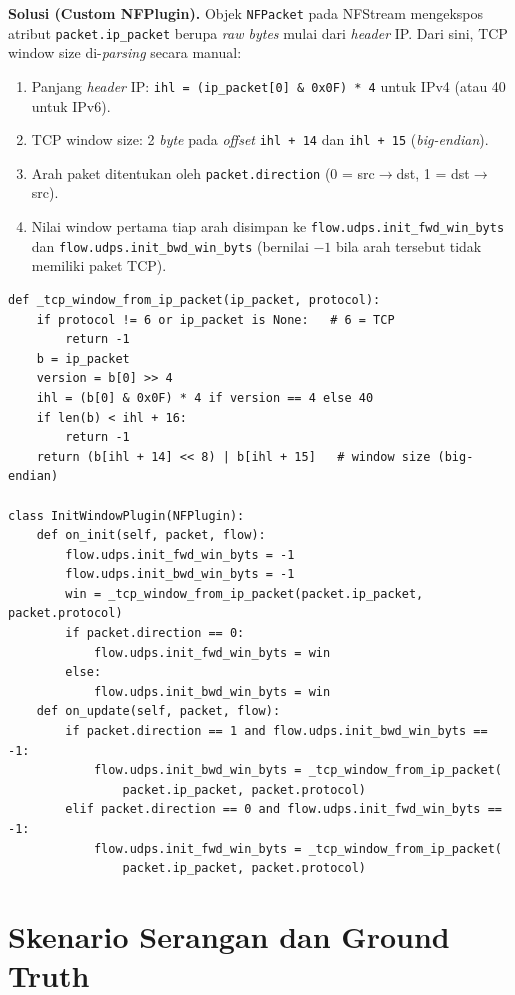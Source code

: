 \documentclass[11pt, a4paper]{article}
\begin{document}
\textbf{Solusi (Custom NFPlugin).} Objek \texttt{NFPacket} pada NFStream mengekspos atribut \texttt{packet.ip\_packet} berupa \textit{raw bytes} mulai dari \textit{header} IP. Dari sini, TCP window size di-\textit{parsing} secara manual:
\begin{enumerate}[leftmargin=1.4cm]
    \item Panjang \textit{header} IP: \texttt{ihl = (ip\_packet[0] \& 0x0F) * 4} untuk IPv4 (atau 40 untuk IPv6).
    \item TCP window size: 2 \textit{byte} pada \textit{offset} \texttt{ihl + 14} dan \texttt{ihl + 15} (\textit{big-endian}).
    \item Arah paket ditentukan oleh \texttt{packet.direction} (0 = src$\to$dst, 1 = dst$\to$src).
    \item Nilai window pertama tiap arah disimpan ke \texttt{flow.udps.init\_fwd\_win\_byts} dan \texttt{flow.udps.init\_bwd\_win\_byts} (bernilai $-1$ bila arah tersebut tidak memiliki paket TCP).
\end{enumerate}

\begin{lstlisting}[style=py, caption={Inti plugin ekstraksi TCP window size (nfstream\_win\_extract.py)}]
def _tcp_window_from_ip_packet(ip_packet, protocol):
    if protocol != 6 or ip_packet is None:   # 6 = TCP
        return -1
    b = ip_packet
    version = b[0] >> 4
    ihl = (b[0] & 0x0F) * 4 if version == 4 else 40
    if len(b) < ihl + 16:
        return -1
    return (b[ihl + 14] << 8) | b[ihl + 15]   # window size (big-endian)

class InitWindowPlugin(NFPlugin):
    def on_init(self, packet, flow):
        flow.udps.init_fwd_win_byts = -1
        flow.udps.init_bwd_win_byts = -1
        win = _tcp_window_from_ip_packet(packet.ip_packet, packet.protocol)
        if packet.direction == 0:
            flow.udps.init_fwd_win_byts = win
        else:
            flow.udps.init_bwd_win_byts = win
    def on_update(self, packet, flow):
        if packet.direction == 1 and flow.udps.init_bwd_win_byts == -1:
            flow.udps.init_bwd_win_byts = _tcp_window_from_ip_packet(
                packet.ip_packet, packet.protocol)
        elif packet.direction == 0 and flow.udps.init_fwd_win_byts == -1:
            flow.udps.init_fwd_win_byts = _tcp_window_from_ip_packet(
                packet.ip_packet, packet.protocol)
\end{lstlisting}

\section{Skenario Serangan dan Ground Truth}
\end{document}

